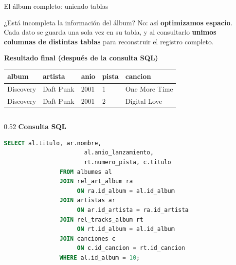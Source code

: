 \documentclass[aspectratio=169, 10pt]{beamer}
\begin{document}
\begin{frame}[t,fragile]{El álbum completo: uniendo tablas}
    \centering
    \footnotesize
    \setlength{\tabcolsep}{4pt}
    \renewcommand{\arraystretch}{1.0}

    \begin{block}{¿Está incompleta la información del álbum?}
        \footnotesize
        No: así \textbf{optimizamos espacio}. Cada dato se guarda una sola
        vez en su tabla, y al consultarlo \textbf{unimos columnas de
        distintas tablas} para reconstruir el registro completo.
    \end{block}

    \vspace{0.2cm}
    \textbf{Resultado final (después de la consulta SQL)}\par\vspace{0.1cm}
    \begin{tabular}{lllll}
        \toprule
        \textbf{album} & \textbf{artista} & \textbf{anio} &
        \textbf{pista} & \textbf{cancion} \\
        \midrule
        Discovery & Daft Punk & 2001 & 1 & One More Time \\
        Discovery & Daft Punk & 2001 & 2 & Digital Love  \\
        \bottomrule
    \end{tabular}

    \vspace{0.3cm}
    \begin{columns}[T]
        \begin{column}{0.52\textwidth}
            \textbf{Consulta SQL}
            \begin{lstlisting}[language=SQL,basicstyle=\ttfamily\tiny]
                SELECT al.titulo, ar.nombre,
                       al.anio_lanzamiento,
                       rt.numero_pista, c.titulo
                FROM albumes al
                JOIN rel_art_album ra
                     ON ra.id_album = al.id_album
                JOIN artistas ar
                     ON ar.id_artista = ra.id_artista
                JOIN rel_tracks_album rt
                     ON rt.id_album = al.id_album
                JOIN canciones c
                     ON c.id_cancion = rt.id_cancion
                WHERE al.id_album = 10;
            \end{lstlisting}
        \end{column}


\end{columns}
\end{frame}
\end{document}
